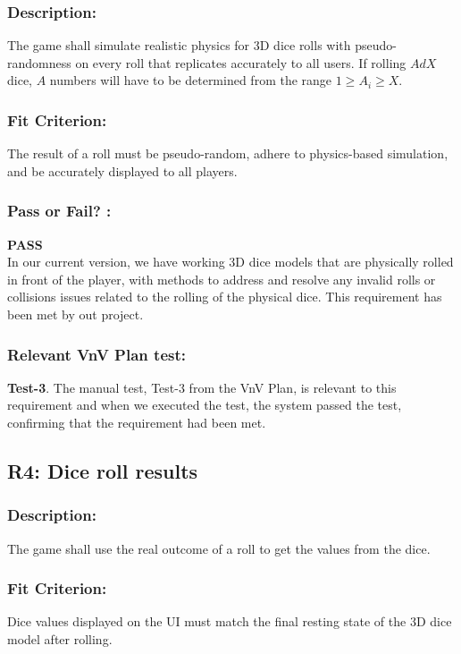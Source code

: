 \documentclass[12pt, titlepage]{article}
\begin{document}
\subsubsection*{Description:}The game shall simulate realistic physics for 3D dice rolls with pseudo-randomness on every roll that replicates accurately to all users. If rolling $AdX$ dice, $A$ numbers will have to be determined from the range $1 \geq A_{i} \geq X$.

\subsubsection*{Fit Criterion:} The result of a roll must be pseudo-random, adhere to physics-based simulation, and be accurately displayed to all players.

\subsubsection*{Pass or Fail? :} 

 \noindent \textbf{PASS}\\
 
 In our current version, we have working 3D dice models that are physically rolled in front of the player, with methods to address and resolve any invalid rolls or collisions issues related to the rolling of the physical dice.  This requirement has been met by out project.

 \subsubsection*{Relevant VnV Plan test: }  \textbf{ Test-3}. The manual test, Test-3 from the VnV Plan, is relevant to this requirement and when we executed the test, the system passed the test, confirming that the requirement had been met.


\subsection{R4: Dice roll results} 
\label{R4} 

\subsubsection*{Description:}The game shall use the real outcome of a roll to get the values from the dice.
  
\subsubsection*{Fit Criterion:} Dice values displayed on the UI must match the final resting state of the 3D dice model after rolling.
\end{document}
